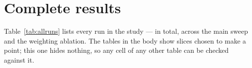 



\section{Complete results}
\label{app:allruns}

Table~\ref{tab:allruns} lists every run in the study --- \AllRunCount{} in
total, across the main sweep and the weighting ablation. The tables in the body
show slices chosen to make a point; this one hides nothing, so any cell of any
other table can be checked against it.


